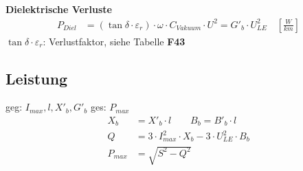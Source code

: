 \textbf{Dielektrische Verluste}
\begin{align*}
    P_{Diel} &= (\tan \delta \cdot \varepsilon_{r}) \cdot \omega \cdot C_{\mathit{Vakuum}} \cdot U^2 = G'_b\cdot U^2_{LE} \quad [\frac{W}{km}]
\end{align*}
\indent $\tan \delta \cdot \varepsilon_{r}$: Verlustfaktor, siehe Tabelle \textbf{F43}


\subsection{Leistung}
geg: $I_{max} , l , X'_b, G'_b$ \qquad ges: $P_{max}$
\begin{align*}
    X_b &= X'_b \cdot l \qquad B_b = B'_b \cdot l \\
    Q &= 3 \cdot I^2_{max} \cdot X_b - 3 \cdot U^2_{LE} \cdot B_b\\
    P_{max} &= \sqrt{S^2-Q^2}
\end{align*}
